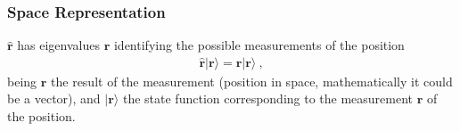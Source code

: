 \documentclass[letterpaper,10pt,english]{jupyterBook}
\begin{document}
\subsubsection{Space Representation}
\label{\detokenize{ch/quantum-mechanics/intro:space-representation}}\label{\detokenize{ch/quantum-mechanics/intro:quantum-mechanics-intro-non-relativistic-basis-space}}
\sphinxAtStartPar
{} \(\hat{\mathbf{r}}\) has eigenvalues \(\mathbf{r}\) identifying the possible measurements of the position
\begin{equation*}
\begin{split}\hat{\mathbf{r}} | \mathbf{r} \rangle = \mathbf{r} | \mathbf{r} \rangle \ ,\end{split}
\end{equation*}
\sphinxAtStartPar
being \(\mathbf{r}\) the result of the measurement (position in space, mathematically it could be a vector), and \(| \mathbf{r} \rangle\) the state function corresponding to the measurement \(\mathbf{r}\) of the position.
\end{document}

